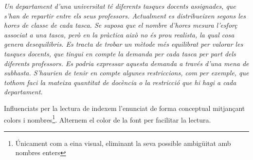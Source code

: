 \documentclass[10pt,twocolumn]{article}
\begin{document}
\vspace{5mm}

\begin{tcolorbox}[colback=black!1,title=\textbf{Enunciat del problema},coltitle=black,colbacktitle=black!10]
\textit{
Un departament d'una universitat té diferents tasques docents assignades, que s'han de repartir entre els seus professors. Actualment es distribueixen segons les hores de classe de cada tasca. Se suposa que el nombre d'hores mesura l'esforç associat a una tasca, però en la pràctica això no és prou realista, la qual cosa genera desequilibris. Es tracta de trobar un mètode més equilibrat per valorar les tasques docents, que tingui en compte la demanda per cada tasca per part dels diferents professors. Es podria expressar aquesta demanda a través d'una mena de subhasta. S'haurien de tenir en compte algunes restriccions, com per exemple, que tothom faci la mateixa quantitat de docència o la restricció que hi hagi a cada departament.
}
\end{tcolorbox}
Influenciats per la lectura de \cite{tah} indexem l'enunciat de forma conceptual mitjançant colors i nombres\footnote{Únicament com a eina visual, eliminant la seva possible ambigüitat amb nombres enters}. Alternem el color de la font per facilitar la lectura. 
\vspace{3mm}
\end{document}
